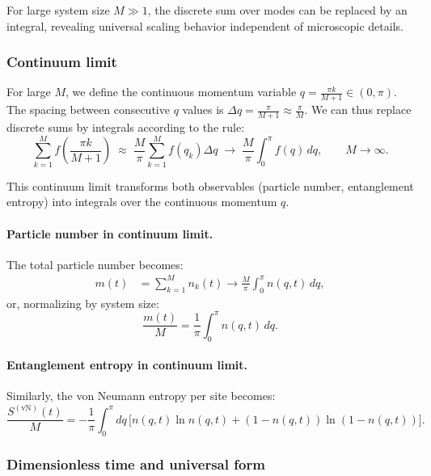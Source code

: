 \documentclass[12pt,oneside,openright]{report}
\theoremstyle{definition}
\theoremstyle{plain}
\theoremstyle{remark}
\begin{document}
For large system size $M \gg 1$, the discrete sum over modes can be replaced by an integral, revealing universal scaling behavior independent of microscopic details.

\subsubsection{Continuum limit}

For large $M$, we define the continuous momentum variable $q = \frac{\pi k}{M+1} \in (0,\pi)$. The spacing between consecutive $q$ values is $\Delta q = \frac{\pi}{M+1} \approx \frac{\pi}{M}$. We can thus replace discrete sums by integrals according to the rule:
\begin{equation}
\sum_{k=1}^M f\!\left(\frac{\pi k}{M+1}\right) \;\approx\; \frac{M}{\pi} \sum_{k=1}^M f(q_k) \Delta q \;\longrightarrow\; \frac{M}{\pi} \int_0^{\pi} f(q)\, dq, \qquad M\to\infty.
\end{equation}

This continuum limit transforms both observables (particle number, entanglement entropy) into integrals over the continuous momentum $q$.

\paragraph{Particle number in continuum limit.}
The total particle number becomes:
\begin{align}
m(t) &= \sum_{k=1}^M n_k(t) \to \frac{M}{\pi} \int_0^{\pi} n(q,t)\, dq,
\end{align}
or, normalizing by system size:
\begin{equation}
\frac{m(t)}{M} = \frac{1}{\pi} \int_0^{\pi} n(q,t)\, dq.
\end{equation}

\paragraph{Entanglement entropy in continuum limit.}
Similarly, the von Neumann entropy per site becomes:
\begin{equation}
\frac{S^{(\text{vN})}(t)}{M} = -\frac{1}{\pi} \int_0^{\pi} dq \, \Big[n(q,t) \ln n(q,t) + (1-n(q,t)) \ln(1-n(q,t))\Big].
\label{eq:SvN_continuum}
\end{equation}

\subsubsection{Dimensionless time and universal form}
\end{document}
